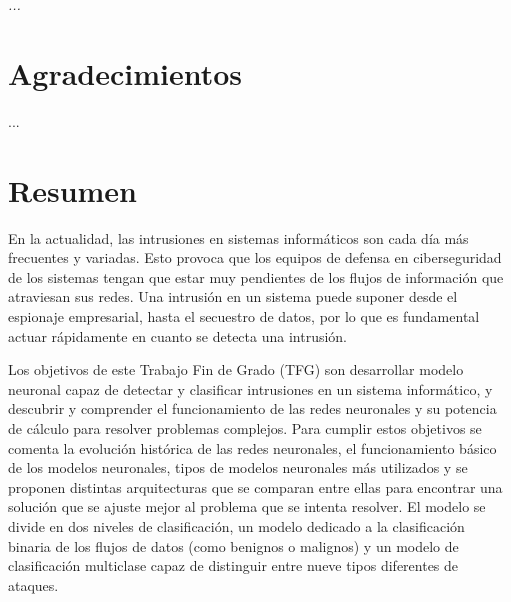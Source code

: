 \documentclass[openright,twoside,10pt]{book}
\begin{document}
\chapter*{}
\begin{flushright}
\textit{%
...}
\end{flushright}

\chapter*{Agradecimientos} %

...

\chapter*{Resumen} %

En la actualidad, las intrusiones en sistemas informáticos son cada día más frecuentes y variadas. Esto provoca que los equipos de defensa en ciberseguridad de los sistemas tengan que estar muy pendientes de los flujos de información que atraviesan sus redes. Una intrusión en un sistema puede suponer desde el espionaje empresarial, hasta el secuestro de datos, por lo que es fundamental actuar rápidamente en cuanto se detecta una intrusión.

Los objetivos de este Trabajo Fin de Grado (TFG) son desarrollar modelo neuronal capaz de detectar y clasificar intrusiones en un sistema informático, y descubrir y comprender el funcionamiento de las redes neuronales y su potencia de cálculo para resolver problemas complejos. Para cumplir estos objetivos se comenta la evolución histórica de las redes neuronales, el funcionamiento básico de los modelos neuronales, tipos de modelos neuronales más utilizados y se proponen distintas arquitecturas que se comparan entre ellas para encontrar una solución que se ajuste mejor al problema que se intenta resolver. El modelo se divide en dos niveles de clasificación, un modelo dedicado a la clasificación binaria de los flujos de datos (como benignos o malignos) y un modelo de clasificación multiclase capaz de distinguir entre nueve tipos diferentes de ataques.
\end{document}
